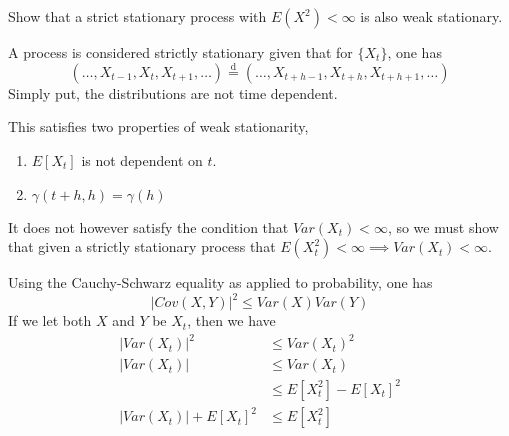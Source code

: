 \documentclass[10pt,a4paper]{exam}
\begin{document}
\begin{questions}

\question Show that a strict stationary process with $E(X^2) < \infty$ is also weak stationary.

\begin{solution}
A process is considered strictly stationary given that for $\{X_t\}$, one has
$$(\dots, X_{t-1}, X_t, X_{t+1}, \dots) \overset{\text{d}}{=} (\dots, X_{t+h-1}, X_{t+h}, X_{t+h+1}, \dots)$$
Simply put, the distributions are not time dependent.

This satisfies two properties of weak stationarity,
\begin{enumerate}
\item $E[X_t]$ is not dependent on $t$.
\item $\gamma(t+h,h) = \gamma(h)$
\end{enumerate} 
It does not however satisfy the condition that $Var(X_t) < \infty$, so we must show that given a strictly stationary process that $E(X_t^2) < \infty \implies Var(X_t) < \infty$.

Using the Cauchy-Schwarz equality as applied to probability, one has
$$|Cov(X,Y)|^2 \leq Var(X)Var(Y)$$
If we let both $X$ and $Y$ be $X_t$, then we have
\begin{align*}
|Var(X_t)|^2 	&\leq Var(X_t)^2\\
|Var(X_t)| 		&\leq Var(X_t)\\
					&\leq E[X_t^2] - E[X_t]^2\\
|Var(X_t)| + E[X_t]^2 &\leq E[X_t^2]
\end{align*}


\end{solution}
\end{questions}
\end{document}

